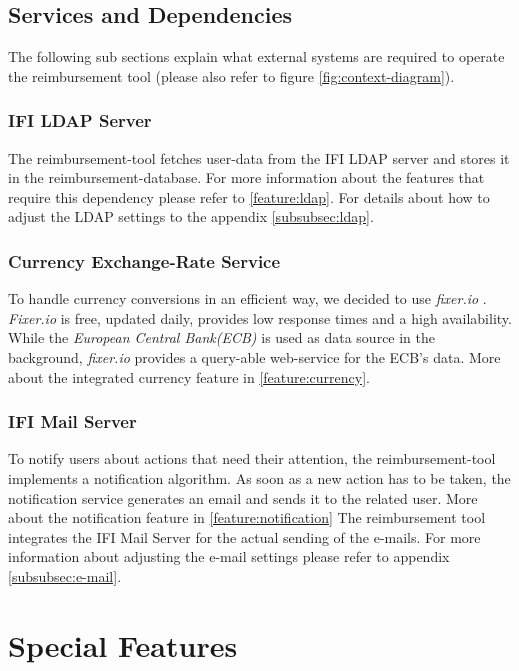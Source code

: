 \subsection{Services and Dependencies}
The following sub sections explain what external systems are required to operate the reimbursement tool (please also refer to figure \ref{fig:context-diagram}).

\subsubsection{IFI LDAP Server}
The reimbursement-tool fetches user-data from the IFI LDAP server  and stores it in the reimbursement-database.  For more information about the features that require this dependency please refer to \ref{feature:ldap}. For details about how to adjust the LDAP settings to the appendix \ref{subsubsec:ldap}.

\subsubsection{Currency Exchange-Rate Service}
To handle currency conversions in an efficient way, we decided to use \textit{fixer.io} \cite{fixer}. \textit{Fixer.io} is free, updated daily, provides low response times and a high availability. While the \textit{European Central Bank(ECB)}\cite{ecb} is used as data source in the background, \textit{fixer.io} provides a query-able web-service for the ECB's data. More about the integrated currency feature in \ref{feature:currency}.

\subsubsection{IFI Mail Server}
\label{dep:email}
To notify users about actions that need their attention, the reimbursement-tool implements a notification algorithm. As soon as a new action has to be taken, the notification service generates an email and sends it to the related user. More about the notification feature in \ref{feature:notification} The reimbursement tool integrates the IFI Mail Server for the actual sending of the e-mails. For more information about adjusting the e-mail settings please refer to appendix \ref{subsubsec:e-mail}.
\newpage



\section{Special Features}

